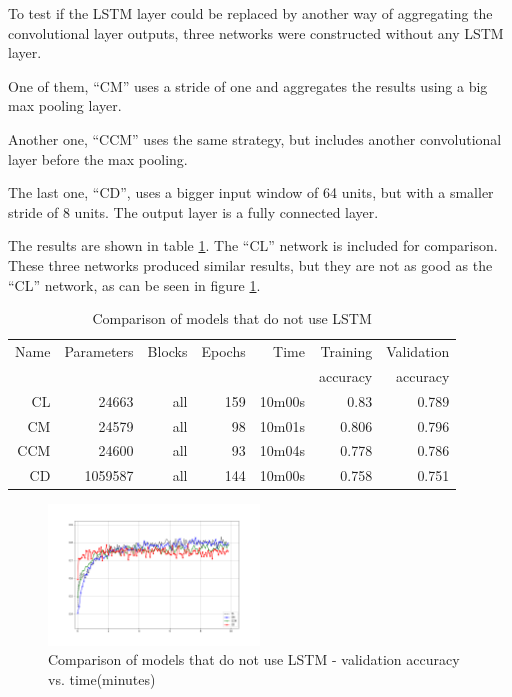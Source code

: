 To test if 
the LSTM layer could be replaced by 
another way of aggregating the convolutional layer outputs, three networks were constructed without any LSTM layer.

One of them, ``CM'' uses a stride of one and aggregates the results using a big max pooling layer.

Another one, ``CCM'' uses the same strategy, but includes another convolutional layer before the max pooling.

The last one, ``CD'', uses a bigger input window of 64 units, but with a smaller stride of 8 units. The output layer is a fully connected layer.

The results are shown in table \ref{tab:carvingnolstm}. The ``CL'' network is included for comparison.
These three networks produced similar results, but they are not as good as the ``CL'' network, as can be seen in figure
\ref{fig:nolstm}.


\begin{table}[!ht]
    \centering
    \caption[No LSTM]{Comparison of models that do not use LSTM}
    \label{tab:carvingnolstm}
\begin{tabular}{r|r|r|r|r|r|r}
\hline
Name & Parameters & Blocks & Epochs & Time & Training          & Validation          \\       
     &            &        &        &         &          accuracy &            accuracy \\ \hline\hline

CL      & 24663     & all   & 159   & 10m00s    & 0.83  & 0.789 \\\hline
CM      & 24579     & all   & 98    & 10m01s    & 0.806 & 0.796 \\\hline
CCM     & 24600     & all   & 93    & 10m04s    & 0.778 & 0.786 \\\hline
CD      & 1059587   & all   & 144   & 10m00s    & 0.758 & 0.751 \\\hline
\end{tabular}
\end{table}

\begin{figure}[htb!]
\centering\includegraphics[width=0.50\textwidth]{content/CL-CM-CCM-CD.png}
\caption[No LSTM]{\label{fig:nolstm}Comparison of models that do not use LSTM - validation accuracy vs. time(minutes)}%
\end{figure}

